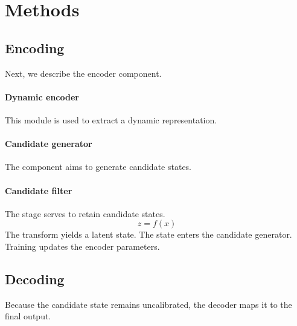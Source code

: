 \documentclass{article}
\begin{document}
\section{Methods}
\subsection{Encoding}
Next, we describe the encoder component.
\paragraph{Dynamic encoder}
This module is used to extract a dynamic representation.
\paragraph{Candidate generator}
The component aims to generate candidate states.
\paragraph{Candidate filter}
The stage serves to retain candidate states.
\begin{equation}
z = f(x)
\end{equation}
The transform yields a latent state.
The state enters the candidate generator.
Training updates the encoder parameters.
\subsection{Decoding}
Because the candidate state remains uncalibrated, the decoder maps it to the final output.
\end{document}
